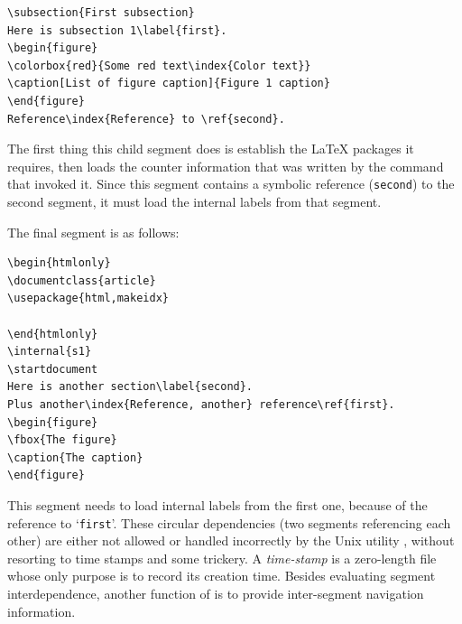 \begin{changebar}
\begin{small}
\begin{verbatim}
\subsection{First subsection}
Here is subsection 1\label{first}.
\begin{figure}
\colorbox{red}{Some red text\index{Color text}}
\caption[List of figure caption]{Figure 1 caption}
\end{figure}
Reference\index{Reference} to \ref{second}.
\end{verbatim}
\end{small}
The first thing this child segment does is establish the \LaTeX{} 
packages it requires, then loads the counter information that
was written by the  command that invoked it.
Since this segment contains a symbolic reference (\texttt{second})
to the second segment, it must load the internal labels from
that segment.

\medskip\htmlrule[width=300]
\html{\\}\noindent
The final segment  is as follows:
\begin{small}
\begin{verbatim}
\begin{htmlonly}
\documentclass{article}
\usepackage{html,makeidx}

\end{htmlonly}
\internal{s1}
\startdocument
Here is another section\label{second}.
Plus another\index{Reference, another} reference\ref{first}.
\begin{figure}
\fbox{The figure}
\caption{The caption}
\end{figure}
\end{verbatim}
\end{small}
%
%
%
\html{\\}\noindent
This segment needs to load internal labels from the first one,
because of the reference to `\texttt{first}'.  These circular
dependencies (two segments referencing each other) are either not
allowed or handled incorrectly by the Unix utility , 
without resorting to time stamps and some trickery.  
A \textit{time-stamp} is a zero-length file whose only purpose is to record
its creation time.  
Besides evaluating segment interdependence,
another function of  is to provide inter-segment
navigation information.


\end{changebar}

